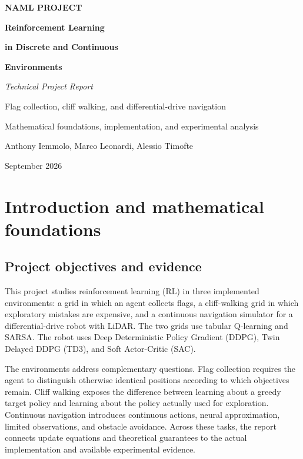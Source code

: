\documentclass[11pt,a4paper]{article}
\theoremstyle{definition}
\theoremstyle{plain}
\theoremstyle{remark}
\begin{document}
\begin{titlepage}
\centering
\vspace*{3cm}
{\color{accent2}\bfseries\large NAML PROJECT}\par
\vspace{0.6cm}
{\color{accent}\bfseries\Huge Reinforcement Learning}\par
\vspace{0.3cm}
{\color{accent}\bfseries\Huge in Discrete and Continuous}\par
\vspace{0.3cm}
{\color{accent}\bfseries\Huge Environments}\par
\vspace{0.8cm}
{\color{greytext}\itshape\Large Technical Project Report}\par
\vspace{0.5cm}
{\color{greytext}\large Flag collection, cliff walking, and differential-drive navigation}\par
\vspace{0.4cm}
{\color{greytext} Mathematical foundations, implementation, and experimental analysis}
\vfill
{\color{greytext}\large Anthony Iemmolo, Marco Leonardi, Alessio Timofte\par}
\vfill
{\color{greytext} September 2026}
\end{titlepage}

\tableofcontents
\thispagestyle{empty}
\clearpage

\section{Introduction and mathematical foundations}
\label{sec:foundations}

\subsection{Project objectives and evidence}

This project studies reinforcement learning (RL) in three implemented environments: a grid in which an agent collects flags, a cliff-walking grid in which exploratory mistakes are expensive, and a continuous navigation simulator for a differential-drive robot with LiDAR. The two grids use tabular Q-learning and SARSA. The robot uses Deep Deterministic Policy Gradient (DDPG), Twin Delayed DDPG (TD3), and Soft Actor-Critic (SAC).

The environments address complementary questions. Flag collection requires the agent to distinguish otherwise identical positions according to which objectives remain. Cliff walking exposes the difference between learning about a greedy target policy and learning about the policy actually used for exploration. Continuous navigation introduces continuous actions, neural approximation, limited observations, and obstacle avoidance. Across these tasks, the report connects update equations and theoretical guarantees to the actual implementation and available experimental evidence.
\end{document}
